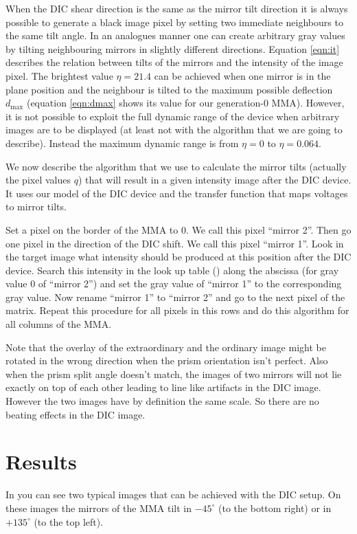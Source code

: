 When the DIC shear direction is the same as the mirror tilt direction
it is always possible to generate a black image pixel by setting two
immediate neighbours to the same tilt angle. In an analogues manner
one can create arbitrary gray values by tilting neighbouring mirrors
in slightly different directions. Equation \eqref{eqn:it} describes
the relation between tilts of the mirrors and the intensity of the
image pixel. The brightest value $\eta=21.4$ can be achieved when one
mirror is in the plane position and the neighbour is tilted to the
maximum possible deflection $d_\textrm{max}$ (equation
\eqref{eqn:dmax} shows its value for our generation-0 MMA).  However,
it is not possible to exploit the full dynamic range of the device
when arbitrary images are to be displayed (at least not with the
algorithm that we are going to describe).  Instead the maximum dynamic
range is from $\eta=0$ to $\eta=0.064$.

We now describe the algorithm that we use to calculate the mirror
tilts (actually the pixel values $q$) that will result in a given
intensity image after the DIC device. It uses our model of the DIC
device and the transfer function that maps voltages to mirror tilts.

Set a pixel on the border of the MMA to 0. We call this pixel ``mirror
2''. Then go one pixel in the direction of the DIC shift. We call this
pixel ``mirror 1''. Look in the target image what intensity should be
produced at this position after the DIC device. Search this intensity
in the look up table () along the abscissa
(for gray value 0 of ``mirror 2'') and set the gray value of ``mirror
1'' to the corresponding gray value. Now rename ``mirror 1'' to
``mirror 2'' and go to the next pixel of the matrix. Repeat this
procedure for all pixels in this rows and do this algorithm for all
columns of the MMA.

Note that the overlay of the extraordinary and the ordinary image
might be rotated in the wrong direction when the prism orientation
isn't perfect. Also when the prism split angle doesn't match, the
images of two mirrors will not lie exactly on top of each other
leading to line like artifacts in the DIC image. However the two
images have by definition the same scale. So there are no beating
effects in the DIC image.

\section{Results}
In  you can see two typical images that can be
achieved with the DIC setup. On these images the mirrors of the MMA
tilt in $-45^\circ$ (to the bottom right) or in $+135^\circ$ (to the
top left).

